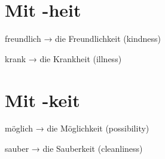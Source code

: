 \documentclass[a4paper]{article}
\title{}
\date{}
\begin{document}
\maketitle
    \section{Mit -heit}
        freundlich → die Freundlichkeit (kindness)
        
        krank → die Krankheit (illness)
    \section{Mit -keit}
        möglich → die Möglichkeit (possibility)
        
        sauber → die Sauberkeit (cleanliness)
\end{document}
